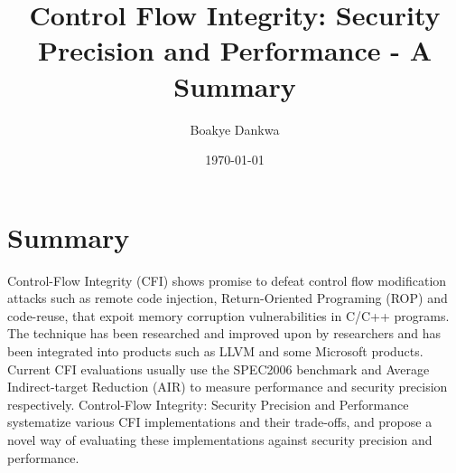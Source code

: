 \documentclass[dvips,12pt]{article}
\begin{document}

\title{Control Flow Integrity: Security Precision and Performance - A Summary}
\author{Boakye Dankwa}
\date{\today}



\maketitle


\section{Summary}
Control-Flow Integrity (CFI) shows promise to defeat control flow modification attacks such as remote code injection, Return-Oriented Programing (ROP) and code-reuse, that expoit memory corruption vulnerabilities in C/C++ programs. The technique has been researched and improved upon by researchers and has been integrated into products such as LLVM and some Microsoft products. Current CFI evaluations usually use the SPEC2006 benchmark and Average Indirect-target Reduction (AIR) to measure performance and security precision respectively. Control-Flow Integrity: Security Precision and Performance \cite{DBLP:journals/corr/BurowCBPNLF16} systematize various CFI implementations and their trade-offs, and propose a novel way of evaluating these implementations against security precision and performance.
\newline
\newline
\end{document}
